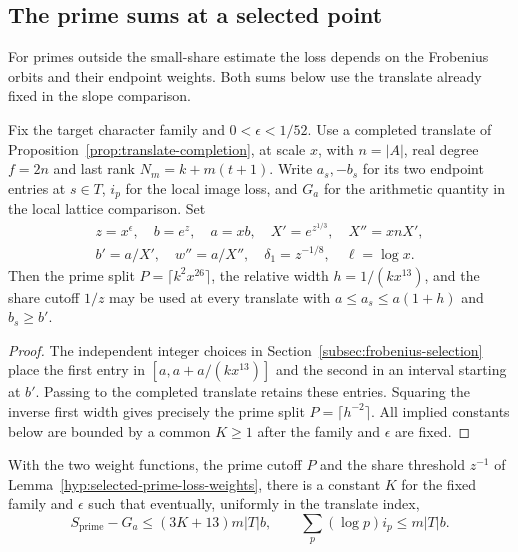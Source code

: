 \subsection{The prime sums at a selected point}\label{subsec:loss-prime-account}
\hypertarget{source-prime-class-loss}{}

For primes outside the small-share estimate the loss depends on the Frobenius orbits and their endpoint weights. Both sums below use the translate already fixed in the slope comparison.

\begin{established}\label{hyp:selected-prime-loss-weights}
Fix the target character family and \(0<\epsilon<1/52\).
Use a completed translate of Proposition~\ref{prop:translate-completion}, at
scale \(x\), with \(n=|A|\), real degree \(f=2n\) and last rank
\(N_m=k+m(t+1)\). Write \(a_s,-b_s\) for its two endpoint entries at
\(s\in T\), \(i_p\) for the local image loss, and \(G_a\) for the
arithmetic quantity in the local lattice comparison. Set
\[
 \begin{gathered}
 z=x^\epsilon,\quad b=e^z,\quad a=xb,\quad X'=e^{z^{1/3}},\quad X''=xnX',\\
 b'=a/X',\quad w''=a/X'',\quad \delta_1=z^{-1/8},\quad \ell=\log x .
 \end{gathered}
\]
Then the prime split \(P=\lceil k^2x^{26}\rceil\), the relative width
\(h=1/(kx^{13})\), and the share cutoff \(1/z\) may be used at every
translate with \(a\le a_s\le a(1+h)\) and \(b_s\ge b'\).
\end{established}
\begin{proof}
The independent integer choices in Section~\ref{subsec:frobenius-selection}
place the first entry in \([a,a+a/(kx^{13})]\) and the second in an
interval starting at \(b'\). Passing to the completed translate retains
these entries. Squaring the inverse first width gives precisely the
prime split \(P=\lceil h^{-2}\rceil\). All implied constants below are
bounded by a common \(K\ge1\) after the family and \(\epsilon\) are fixed.
\end{proof}

\begin{proposition}
\label{prop:joint-prime-loss}
With the two weight functions, the prime cutoff \(P\) and the
share threshold \(z^{-1}\) of Lemma~\ref{hyp:selected-prime-loss-weights},
there is a constant \(K\) for the fixed
family and \(\epsilon\) such that eventually, uniformly in
the translate index,
\begin{equation}\label{eq:joint-prime-loss}
 S_{\mathrm{prime}}-G_a\le(3K+13)m|T|b,\qquad
 \sum_p(\log p)i_p\le m|T|b .
\end{equation}
\end{proposition}

